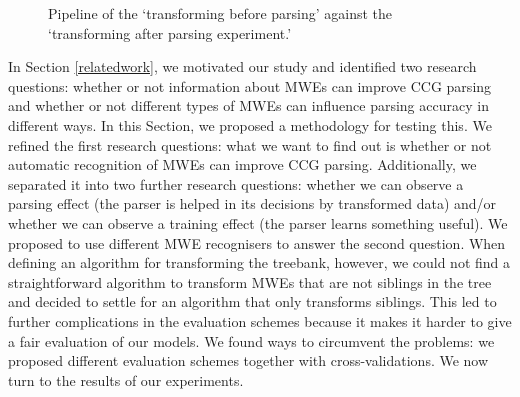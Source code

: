 \documentclass[output=paper]{LSP/langsci}
\begin{document}
    \begin{figure}[H]
        \small
        \caption{Pipeline of the `transforming before parsing' against the `transforming after parsing experiment.' \label{fig:pipel2}}
    \end{figure}

    \indent In Section \ref{relatedwork}, we motivated our study and identified two research questions: whether or not information about MWEs can improve CCG parsing and whether or not different types of MWEs can influence parsing accuracy in different ways. In this Section, we proposed a methodology for testing this. We refined the first research questions: what we want to find out is whether or not automatic recognition of MWEs can improve CCG parsing. Additionally, we separated it into two further research questions: whether we can observe a parsing effect (the parser is helped in its decisions by transformed data) and/or whether we can observe a training effect (the parser learns something useful). We proposed to use different MWE recognisers to answer the second question. When defining an algorithm for transforming the treebank, however, we could not find a straightforward algorithm to transform MWEs that are not siblings in the tree and decided to settle for an algorithm that only transforms siblings. This led to further complications in the evaluation schemes because it makes it harder to give a fair evaluation of our models. We found ways to circumvent the problems: we proposed different evaluation schemes together with cross-validations. We now turn to the results of our experiments.
\end{document}
